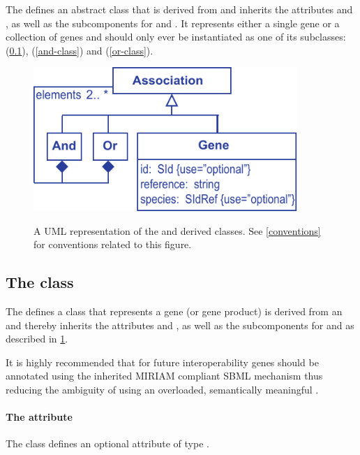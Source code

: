 The \FBCPackage defines an abstract \Association class that is derived from \SBase and inherits the attributes  and , as well as the subcomponents for \Annotation and \Notes. It represents either a single gene or a collection of genes and should only ever be instantiated as one of its subclasses: \Gene (\ref{gene-class}), \GeneAnd (\ref{and-class}) and \GeneOr (\ref{or-class}).

\begin{figure}[h!]
  \centering
  \includegraphics[width=10cm]{images/fbc_uml_ass.pdf}\\
  \caption{A UML representation of the \FBCPackage \Association and derived classes. See \ref{conventions} for conventions related to this figure.}
  \label{fig:fbc_uml_ass}
\end{figure}

\subsection{The \FBC {} class}
\label{gene-class}

The \FBCPackage defines a \Gene class that represents a gene (or gene product) is derived from an \Association and thereby inherits the \SBase attributes  and , as well as the subcomponents for \Annotation and \Notes as described in \ref{fig:fbc_uml_ass}.

It is highly recommended that for future interoperability genes should be annotated using the inherited MIRIAM compliant SBML \Annotation mechanism thus reducing the ambiguity of using an overloaded, semantically meaningful .

\paragraph{The  attribute}
The \GeneAssociation class defines an optional attribute  of type .

